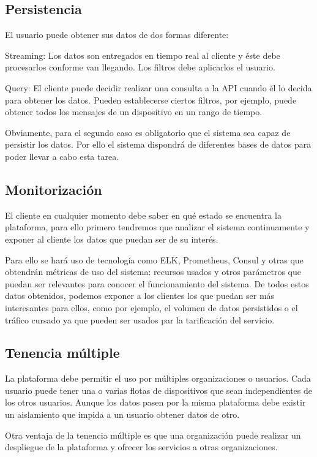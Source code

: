 \subsection{Persistencia}

El usuario puede obtener sus datos de dos formas diferente:

Streaming: Los datos son entregados en tiempo real al cliente y éste debe
procesarlos conforme van llegando. Los filtros debe aplicarlos el usuario.

Query: El cliente puede decidir realizar una consulta a la API cuando él lo
decida para obtener los datos. Pueden establecerse ciertos filtros, por ejemplo,
puede obtener todos los mensajes de un dispositivo en un rango de tiempo.

Obviamente, para el segundo caso es obligatorio que el sistema sea capaz de
persistir los datos. Por ello el sistema dispondrá de diferentes bases de datos
para poder llevar a cabo esta tarea.

\subsection{Monitorización}

El cliente en cualquier momento debe saber en qué estado se encuentra la
plataforma, para ello primero tendremos que analizar el sistema continuamente y
exponer al cliente los datos que puedan ser de su interés.

Para ello se hará uso de tecnología como ELK, Prometheus, Consul y otras que
obtendrán métricas de uso del sistema: recursos usados y otros parámetros que
puedan ser relevantes para conocer el funcionamiento del sistema. De todos estos
datos obtenidos, podemos exponer a los clientes los que puedan ser más
interesantes para ellos, como por ejemplo, el volumen de datos persistidos o el
tráfico cursado ya que pueden ser usados par la tarificación del servicio.

\subsection{Tenencia múltiple}

La plataforma debe permitir el uso por múltiples organizaciones o usuarios.
Cada usuario puede tener una o varias flotas de dispositivos que sean
independientes de los otros usuarios. Aunque los datos pasen por la misma
plataforma debe existir un aislamiento que impida a un usuario obtener datos de
otro.

Otra ventaja de la tenencia múltiple es que una organización puede realizar un
despliegue de la plataforma y ofrecer los servicios a otras organizaciones.

